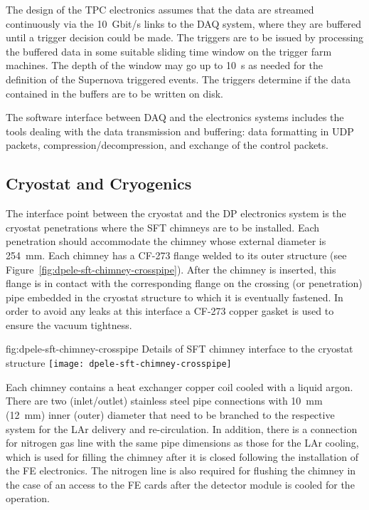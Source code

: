 The design of the TPC electronics assumes that the data are streamed continuously via the \SI{10}{Gbit/s} links to the DAQ system, where they are buffered until a trigger decision could be made. The triggers are to be issued by processing the buffered data in some suitable sliding time window on the trigger farm machines. The depth of the window may go up to \SI{10}{s} as needed for the definition of the Supernova triggered events. The triggers determine if the data contained in the buffers are to be written on disk. 

The software interface between DAQ and the electronics systems includes the tools dealing with the data transmission and buffering: data formatting in UDP packets, compression/decompression, and exchange of the control packets.

\subsection{Cryostat and Cryogenics}
\label{sec:fddp-tpc-elec-intfc-cryo}

The interface point between the cryostat and the DP electronics system is the cryostat penetrations where the SFT chimneys are to be installed. Each penetration should accommodate the chimney whose external diameter is \SI{254}{\mm}. Each chimney has a CF-273 flange welded to its outer structure (see Figure~\ref{fig:dpele-sft-chimney-crosspipe}). After the chimney is inserted, this flange is in contact with the corresponding flange on the crossing (or penetration) pipe embedded in the cryostat structure to which it is eventually fastened. In order to avoid any leaks at this interface a CF-273 copper gasket is used to ensure the vacuum tightness.  

\begin{dunefigure}{fig:dpele-sft-chimney-crosspipe}
{Details of SFT chimney interface to the cryostat structure}
\texttt{[image: dpele-sft-chimney-crosspipe]}
\end{dunefigure}

Each chimney contains a heat exchanger copper coil cooled with a liquid argon. There are two (inlet/outlet) stainless steel pipe connections with \SI{10}{\mm} (\SI{12}{\mm}) inner (outer) diameter that need to be branched to the respective system for the LAr delivery and re-circulation. In addition, there is a connection for nitrogen gas line with the same pipe dimensions as those for the LAr cooling, which is used for filling the chimney after it is closed following the installation of the FE electronics. The nitrogen line is also required for flushing the chimney in the case of an access to the FE cards after the detector module is cooled for the operation. 

